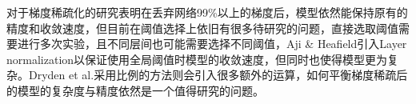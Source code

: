 \documentclass[12pt,onecolumn,letterpaper]{article}
\begin{document}
    对于梯度稀疏化的研究表明在丢弃网络99\%以上的梯度后，模型依然能保持原有的精度和收敛速度，但目前在阈值选择上依旧有很多待研究的问题，直接选取阈值需要进行多次实验，且不同层间也可能需要选择不同阈值，Aji \& Heafield\cite{Aji2017}引入Layer normalization\cite{Ba2016}以保证使用全局阈值时模型的收敛速度，但同时也使得模型更为复杂。Dryden et al.\cite{Dryden2016}采用比例的方法则会引入很多额外的运算，如何平衡梯度稀疏后的模型的复杂度与精度依然是一个值得研究的问题。


    {\small
         
        
    }
\end{document}
